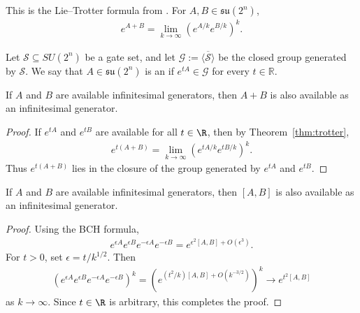 \begin{theorem}[Trotterization]
\label{thm:trotter}
This is the Lie--Trotter formula from \cite{Trotter1959ProductSemigroups}. For $A,B \in \mathfrak{su}(2^n)$,
\begin{align}
    e^{A+B}
    =
    \lim_{k \to \infty}
    \left(
    e^{A/k} e^{B/k}
    \right)^k.
\end{align}
\end{theorem}

\begin{definition}
\label{def:available-infinitesimal-generator}
Let $\mathcal{S} \subseteq SU(2^n)$ be a gate set, and let
$
    \mathcal{G}
    :=
    \overline{\langle \mathcal{S} \rangle}
$
be the closed group generated by $\mathcal{S}$. We say that $A \in \mathfrak{su}(2^n)$ is an  if
$
    e^{tA} \in \mathcal{G}
$
for every $t \in \mathbb{R}$.
\end{definition}

\begin{fact}
\label{fact:generate-sums}
If $A$ and $B$ are available infinitesimal generators, then $A+B$ is also available as an infinitesimal generator.
\end{fact}

\begin{proof}
If $e^{tA}$ and $e^{tB}$ are available for all $t \in \R$, then by Theorem~\ref{thm:trotter},
\begin{align}
    e^{t(A+B)}
    =
    \lim_{k \to \infty}
    \left(
    e^{tA/k} e^{tB/k}
    \right)^k.
\end{align}
Thus $e^{t(A+B)}$ lies in the closure of the group generated by $e^{tA}$ and $e^{tB}$.
\end{proof}

\begin{fact}
\label{fact:generate-commutators}
If $A$ and $B$ are available infinitesimal generators, then $[A,B]$ is also available as an infinitesimal generator.
\end{fact}

\begin{proof}
Using the BCH formula,
\begin{align}
    e^{\epsilon A}
    e^{\epsilon B}
    e^{-\epsilon A}
    e^{-\epsilon B}
    =
    e^{\epsilon^2[A,B]+O(\epsilon^3)}.
\end{align}
For $t >  0$, set $\epsilon=t/k^{1/2}$. Then
\begin{align}
    \left(
    e^{\epsilon A}
    e^{\epsilon B}
    e^{-\epsilon A}
    e^{-\epsilon B}
    \right)^k
    =
    \left(
    e^{(t^2/k)[A,B]+O(k^{-3/2})}
    \right)^k
    \longrightarrow
    e^{t^2[A,B]}
\end{align}
as $k \to \infty$. Since $t \in \R$ is arbitrary, this completes the proof.
\end{proof}

